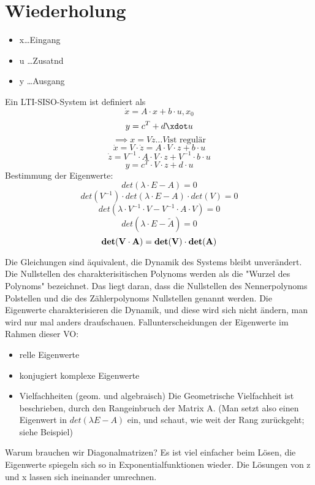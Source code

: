 \documentclass[a4paper]{article}
\begin{document}
\section*{Wiederholung}
    \begin{itemize}
        \item x\ldots Eingang
        \item u \ldots Zusatnd
        \item y \ldots Ausgang
    \end{itemize}
Ein LTI-SISO-System ist definiert als
\[\dot x=A\cdot x + b\cdot u, x_0\]
\[y=c^{T} + d\xdot u\]
\[\implies x=V\dot z \ldots V \text{ist regulär}\]
\[\dot x = V \cdot \dot z = A\cdot V\cdot z + b\cdot u\]
\[\dot z = V^{-1}\cdot A\cdot V\cdot z + V^{-1}\cdot b\cdot u\]
\[y= c^{T}\cdot V\cdot z + d\cdot u\]
Bestimmung der Eigenwerte:
\[det(\lambda \cdot E - A)=0\]
\[det(V^{-1})\cdot det(\lambda \cdot E - A)\cdot det(V)=0\]
\[det(\lambda \cdot V^{-1}\cdot V - V^{-1}\cdot A\cdot V)=0\]
\[det(\lambda \cdot E - \tilde A)=0\]
\[\bold{det(V\cdot A)=det(V)\cdot det(A)}\]

Die Gleichungen sind äquivalent, die Dynamik des Systems bleibt unverändert.\newline
Die Nullstellen des charakterisitischen Polynoms werden als die "Wurzel des Polynoms" bezeichnet. Das liegt daran, dass die Nullstellen des Nennerpolynoms Polstellen und die des Zählerpolynoms Nullstellen genannt werden.
Die Eigenwerte charakterisieren die Dynamik, und diese wird sich nicht ändern, man wird nur mal anders draufschauen.\newline
Fallunterscheidungen der Eigenwerte im Rahmen dieser VO:
\begin{itemize}
    \item relle Eigenwerte
    \item konjugiert komplexe Eigenwerte
    \item Vielfachheiten (geom. und algebraisch)
        Die Geometrische Vielfachheit ist beschrieben, durch den Rangeinbruch der Matrix A. (Man setzt also einen Eigenwert in $det(\lambda E-A)$ ein, und schaut, wie weit der Rang zurückgeht; siehe Beispiel)
\end{itemize}

Warum brauchen wir Diagonalmatrizen? Es ist viel einfacher beim Lösen, die Eigenwerte spiegeln sich so in Exponentialfunktionen wieder. Die Lösungen von z und x lassen sich ineinander umrechnen.\newline
\end{document}
